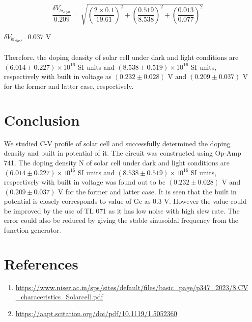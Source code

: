 \documentclass[a4paper, amsfonts, amssymb, amsmath, reprint, showkeys, nofootinbib, twoside]{revtex4-1}
\begin{document}
\begin{equation}
	\frac{\delta V_{bi_{light}}}{ 0.209}=\sqrt{\left( \frac{2\times0.1}{19.61}\right) ^{2}+\left( \frac{0.519}{8.538}\right) ^{2}+\left( \frac{{0.013}}{0.077}\right) ^{2}}
\end{equation}

$\delta V_{bi_{light}}$=0.037 V
\\
\\
Therefore, the doping density of solar cell under dark and light conditions are $(6.014\pm0.227)\times10^{16}$ SI units and $(8.538\pm0.519)\times10^{16}$ SI units, respectively with built in voltage as $(0.232\pm0.028)$ V and $(0.209\pm0.037)$ V for the former and latter case, respectively.

\section{Conclusion}
We studied C-V profile of solar cell and successfully determined the doping density and built in potential of it. The circuit was constructed using Op-Amp 741. The doping density N of solar cell under dark and light conditions are $(6.014\pm0.227)\times10^{16}$ SI units and $(8.538\pm0.519)\times10^{16}$ SI units, respectively with built in voltage was found out to be $(0.232\pm0.028)$ V and $(0.209\pm0.037)$ V for the former and latter case. It is seen that the built in potential is closely corresponds to value of Ge as 0.3 V. However the value could be improved by the use of TL 071 as it has low noise with high slew rate. The error could also be reduced by giving the stable sinusoidal frequency from the function generator. 

\section{References}
\begin{enumerate}
\item{\url{https://www.niser.ac.in/sps/sites/default/files/basic_page/p347_2023/8.CV_characeristics_Solarcell.pdf}}
\item {\url{https://aapt.scitation.org/doi/pdf/10.1119/1.5052360}}


\end{enumerate}
\end{document}
